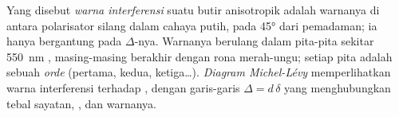 \begin{definition}\label{def:b1:optical-mineralogy:interference-colour}
Yang disebut \emph{warna interferensi} suatu butir anisotropik adalah warnanya di antara polarisator silang dalam cahaya putih, pada \ang{45} dari pemadaman; ia hanya bergantung pada  $\Delta$-nya. Warnanya berulang dalam pita-pita sekitar \qty{550}{nm} , masing-masing berakhir dengan rona merah-ungu; setiap pita adalah sebuah \emph{orde} (pertama, kedua, ketiga\dots). \emph{Diagram Michel-Lévy} memperlihatkan warna interferensi terhadap , dengan garis-garis $\Delta = d\,\delta$ yang menghubungkan tebal sayatan,  , dan warnanya.
\end{definition}


